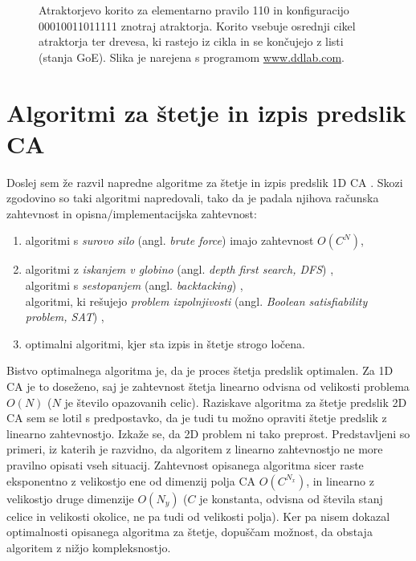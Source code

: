 \documentclass[12pt,a4paper,openany,twoside]{book}
\begin{document}
\begin{figure}[htb]
\centerline{}
\caption[Atraktorjevo korito.]
{Atraktorjevo korito za elementarno pravilo 110 in konfiguracijo 00010011011111 znotraj atraktorja.
Korito vsebuje osrednji cikel atraktorja ter drevesa, ki rastejo iz cikla in se končujejo z listi (stanja GoE).
Slika je narejena s programom \url{www.ddlab.com}.}
\label{basin_of_attraction}
\end{figure}

\section{Algoritmi za štetje in izpis predslik CA}

Doslej sem že razvil napredne algoritme za štetje in izpis predslik 1D CA \cite{JerasDobnikar2007}.
Skozi zgodovino so taki algoritmi napredovali, tako da je padala njihova
računska zahtevnost in opisna/implementacijska zahtevnost:
\begin{enumerate}
 \item algoritmi s \emph{surovo silo} (angl. \emph{brute force}) \cite{WikiBruteForce} imajo zahtevnost \( O(C^N) \),
 \item algoritmi z \emph{iskanjem v globino} (angl. \emph{depth first search, DFS}) \cite{WikiDFS}, \\
       algoritmi s \emph{sestopanjem} (angl. \emph{backtacking}) \cite{WikiBacktracking}, \\
       algoritmi, ki rešujejo \emph{problem izpolnjivosti} (angl. \emph{Boolean satisfiability problem, SAT}) \cite{WikiSAT},
 \item optimalni algoritmi, kjer sta izpis in štetje strogo ločena.
\end{enumerate}

Bistvo optimalnega algoritma je, da je proces štetja predslik optimalen.
Za 1D CA je to doseženo, saj je zahtevnost štetja
linearno odvisna od velikosti problema \(O(N)\) (\(N\) je število opazovanih celic). 
Raziskave algoritma za štetje predslik 2D CA sem se lotil s predpostavko,
da je tudi tu možno opraviti štetje predslik z linearno zahtevnostjo.
Izkaže se, da 2D problem ni tako preprost.
Predstavljeni so primeri, iz katerih je razvidno,
da algoritem z linearno zahtevnostjo ne more pravilno opisati vseh situacij.
Zahtevnost opisanega algoritma sicer raste eksponentno z velikostjo ene
od dimenzij polja CA \( O(C^{N_x}) \), in linearno z velikostjo druge dimenzije \( O(N_y) \)
(\(C\) je konstanta, odvisna od števila stanj celice in velikosti okolice, ne pa tudi od velikosti polja).
Ker pa nisem dokazal optimalnosti opisanega algoritma za štetje,
dopuščam možnost, da obstaja algoritem z nižjo kompleksnostjo.
\end{document}
